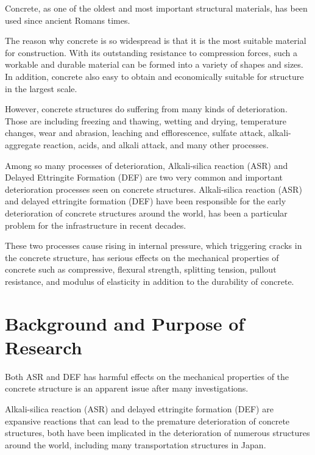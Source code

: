 

Concrete, as one of the oldest and most important structural materials, has been used since ancient Romans times.

The reason why concrete is so widespread is that it is the most suitable material for construction. With its outstanding resistance to compression forces, such a workable and durable material can be formed into a variety of shapes and sizes. In addition, concrete also easy to obtain and economically suitable for structure in the largest scale.

However, concrete structures do suffering from many kinds of deterioration. Those are including freezing and thawing, wetting and drying, temperature changes, wear and abrasion, leaching and efflorescence, sulfate attack, alkali-aggregate reaction, acids, and alkali attack, and many other processes.

Among so many processes of deterioration, Alkali-silica reaction (ASR) and Delayed Ettringite Formation (DEF) are two very common and important deterioration processes seen on concrete structures. Alkali-silica reaction (ASR) and delayed ettringite formation (DEF) have been responsible for the early deterioration of concrete structures around the world, has been a particular problem for the infrastructure in recent decades.

These two processes cause rising in internal pressure, which triggering cracks in the concrete structure, has serious effects on the mechanical properties of concrete such as compressive, flexural strength, splitting tension, pullout resistance, and modulus of elasticity in addition to the durability of concrete.

\section{Background and Purpose of Research}

Both ASR and DEF has harmful effects on the mechanical properties of the concrete structure is an apparent issue after many investigations.

Alkali-silica reaction (ASR) and delayed ettringite formation (DEF) are expansive reactions that can lead to the premature deterioration of concrete structures, both have been implicated in the deterioration of numerous structures around the world, including many transportation structures in Japan\cite{Koichi}.

